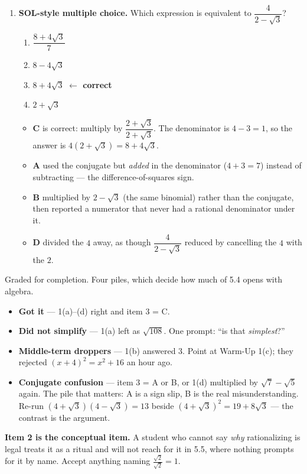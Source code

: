 \documentclass[10pt]{article}
\begin{document}
\begin{enumerate}[leftmargin=1.8em, itemsep=10pt]
  \item \textbf{SOL-style multiple choice.} Which expression is equivalent to
        $\dfrac{4}{2-\sqrt{3}}$?
        \begin{enumerate}[label=\Alph*., leftmargin=1.9em, itemsep=1pt]
          \item $\dfrac{8+4\sqrt{3}}{7}$
          \item $8-4\sqrt{3}$
          \item $8+4\sqrt{3}$ \quad \textcolor{keyred}{\textbf{$\leftarrow$ correct}}
          \item $2+\sqrt{3}$
        \end{enumerate}
        \vspace{2pt}
        \begin{itemize}[leftmargin=1.4em, nosep]
          \item \textbf{C} is correct: multiply by $\dfrac{2+\sqrt3}{2+\sqrt3}$. The denominator is
                $4-3=1$, so the answer is $4\left(2+\sqrt3\right)=8+4\sqrt3$.
          \item \textbf{A} used the conjugate but \emph{added} in the denominator ($4+3=7$) instead
                of subtracting --- the difference-of-squares sign.
          \item \textbf{B} multiplied by $2-\sqrt3$ (the same binomial) rather than the conjugate,
                then reported a numerator that never had a rational denominator under it.
          \item \textbf{D} divided the $4$ away, as though $\dfrac{4}{2-\sqrt3}$ reduced by
                cancelling the $4$ with the $2$.
        \end{itemize}
\end{enumerate}

\begin{teachernote}
\small Graded for completion. Four piles, which decide how much of 5.4 opens with algebra.
\begin{itemize}[leftmargin=1.3em, nosep]
  \item \textbf{Got it} --- 1(a)--(d) right and item 3 = C.
  \item \textbf{Did not simplify} --- 1(a) left as $\sqrt{108}$. One prompt: ``is that
        \emph{simplest}?''
  \item \textbf{Middle-term droppers} --- 1(b) answered $3$. Point at Warm-Up 1(c); they rejected
        $(x+4)^2=x^2+16$ an hour ago.
  \item \textbf{Conjugate confusion} --- item 3 = A or B, or 1(d) multiplied by $\sqrt7-\sqrt5$
        again. The pile that matters: A is a sign slip, B is the real misunderstanding. Re-run
        $\left(4+\sqrt3\right)\left(4-\sqrt3\right)=13$ beside $\left(4+\sqrt3\right)^{2}
        =19+8\sqrt3$ --- the contrast is the argument.
\end{itemize}
\textbf{Item 2 is the conceptual item.} A student who cannot say \emph{why} rationalizing is legal
treats it as a ritual and will not reach for it in 5.5, where nothing prompts for it by name.
Accept anything naming $\frac{\sqrt2}{\sqrt2}=1$.
\end{teachernote}
\end{document}

